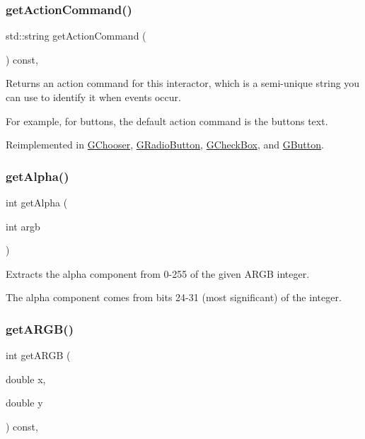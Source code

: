 \subsubsection{\texorpdfstring{get\+Action\+Command()}{getActionCommand()}}
{\footnotesize\ttfamily std\+::string get\+Action\+Command (\begin{DoxyParamCaption}{ }\end{DoxyParamCaption}) const\hspace{0.3cm}{\ttfamily [virtual]}, {\ttfamily [inherited]}}



Returns an action command for this interactor, which is a semi-\/unique string you can use to identify it when events occur. 

For example, for buttons, the default action command is the button\textquotesingle{}s text. 

Reimplemented in \mbox{\hyperlink{classGChooser_a90f2b1e6f6e7dabd9d6e5307f7c6d1b7}{G\+Chooser}}, \mbox{\hyperlink{classGRadioButton_a90f2b1e6f6e7dabd9d6e5307f7c6d1b7}{G\+Radio\+Button}}, \mbox{\hyperlink{classGCheckBox_a90f2b1e6f6e7dabd9d6e5307f7c6d1b7}{G\+Check\+Box}}, and \mbox{\hyperlink{classGButton_a90f2b1e6f6e7dabd9d6e5307f7c6d1b7}{G\+Button}}.

\mbox{\label{classGCanvas_a48d898ddf58651669b5f33240a65096f}} 
\subsubsection{\texorpdfstring{get\+Alpha()}{getAlpha()}}
{\footnotesize\ttfamily int get\+Alpha (\begin{DoxyParamCaption}\item[{int}]{argb }\end{DoxyParamCaption})\hspace{0.3cm}{\ttfamily [static]}}



Extracts the alpha component from 0-\/255 of the given A\+R\+GB integer. 

The alpha component comes from bits 24-\/31 (most significant) of the integer. \mbox{\label{classGDrawingSurface_ae394d39f20476570e083918d991c25bd}} 
\subsubsection{\texorpdfstring{get\+A\+R\+G\+B()}{getARGB()}}
{\footnotesize\ttfamily int get\+A\+R\+GB (\begin{DoxyParamCaption}\item[{double}]{x,  }\item[{double}]{y }\end{DoxyParamCaption}) const\hspace{0.3cm}{\ttfamily [virtual]}, {\ttfamily [inherited]}}



